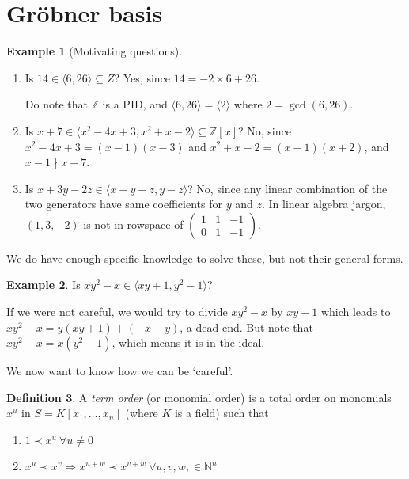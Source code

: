 \documentclass[a4paper]{article}
\theoremstyle{definition}
\newtheorem{defn}{Definition}[subsection]
\newtheorem{example}[defn]{Example}
\begin{document}
\section{Gröbner basis}
\begin{example}[Motivating questions]
\begin{enumerate}
\item Is $14\in \langle 6,26\rangle \subseteq Z$? Yes, since $14=-2\times 6+26$.

Do note that $\mathbb Z$ is a PID, and $\langle 6,26\rangle=\langle 2 \rangle$ where $2=\gcd(6,26)$.
\item Is $x+7\in \langle x^2-4x+3, x^2+x-2\rangle \subseteq \mathbb Z[x]$? No, since $x^2-4x+3=(x-1)(x-3)$ and $x^2+x-2=(x-1)(x+2)$, and $x-1\nmid x+7$.
\item Is $x+3y-2z \in \langle x+y-z, y-z\rangle$? No, since any linear combination of the two generators have same coefficients for $y$ and $z$. In linear algebra jargon, $(1,3,-2)$ is not in rowspace of $\begin{pmatrix}1 & 1 & -1 \\ 0 & 1 & -1 \end{pmatrix}$.
\end{enumerate}
We do have enough specific knowledge to solve these, but not their general forms.
\end{example}
\begin{example}
Is $xy^2-x\in \langle xy+1,y^2-1\rangle$?

If we were not careful, we would try to divide $xy^2-x$ by $xy+1$ which leads to $xy^2-x=y(xy+1)+(-x-y)$, a dead end. But note that $xy^2-x=x(y^2-1)$, which means it is in the ideal.

We now want to know how we can be `careful'.
\end{example}
\begin{defn}
A \textit{term order} (or monomial order) is a total order on monomials $x^u$ in $S=K[x_1,\ldots,x_n]$ (where $K$ is a field) such that
\begin{enumerate}
\item $1\prec x^u \ \forall u\neq 0$
\item $x^u\prec x^v \Rightarrow x^{u+w}\prec  x^{v+w} \ \forall u,v,w,\in \mathbb N^n$
\end{enumerate}
\end{defn}
\end{document}
